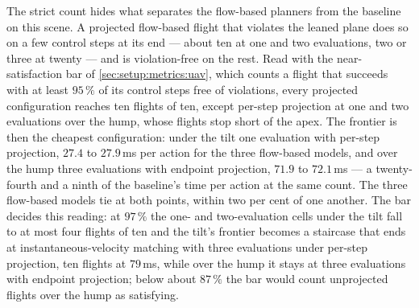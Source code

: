 The strict count hides what separates the flow-based planners from the baseline on this scene. A projected
flow-based flight that violates the leaned plane does so on a few control steps at its end --- about ten
at one and two evaluations, two or three at twenty --- and is violation-free on the rest. Read with the
near-satisfaction bar of \autoref{sec:setup:metrics:uav}, which counts a flight that succeeds with at least
$95\,\%$ of its control steps free of violations, every projected configuration reaches ten flights of
ten, except per-step projection at one and two evaluations over the hump, whose flights stop short of the
apex. The frontier is then the cheapest configuration: under the tilt one evaluation with per-step
projection, $27.4$ to $27.9$\,ms per action for the three flow-based models, and over the hump three
evaluations with endpoint projection, $71.9$ to $72.1$\,ms --- a twenty-fourth and a ninth of the
baseline's time per action at the same count. The three flow-based models tie at both points, within two
per cent of one another. The bar decides this reading: at $97\,\%$ the one- and two-evaluation cells under
the tilt fall to at most four flights of ten and the tilt's frontier becomes a staircase that ends at
instantaneous-velocity matching with three evaluations under per-step projection, ten flights at
$79$\,ms, while over the hump it stays at three evaluations with endpoint projection; below about
$87\,\%$ the bar would count unprojected flights over the hump as satisfying.

